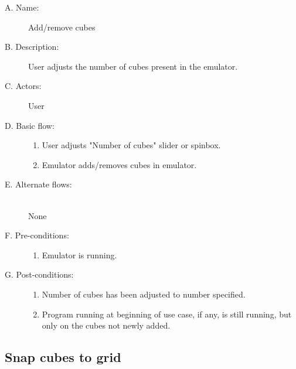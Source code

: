 \documentclass[12pt]{article}
\begin{document}
    \begin{description}
      \item[A. Name:] Add/remove cubes
      \item[B. Description:] User adjusts the number of cubes present in the emulator.
      \item[C. Actors:] User
      \item[D. Basic flow:] \hfill
        \begin{enumerate}
	  \item{User adjusts "Number of cubes" slider or spinbox.}
	  \item{Emulator adds/removes cubes in emulator.}
        \end{enumerate}
      \item[E. Alternate flows:] \hfill \\
	None
      \item[F. Pre-conditions:] \hfill
        \begin{enumerate}
	  \item{Emulator is running.}
        \end{enumerate}
      \item[G. Post-conditions:] \hfill
        \begin{enumerate}
	  \item{Number of cubes has been adjusted to number specified.}
	  \item{Program running at beginning of use case, if any, is still running, but only on the cubes not newly added.}
        \end{enumerate}
    \end{description}

  \subsection{Snap cubes to grid}
\end{document}
